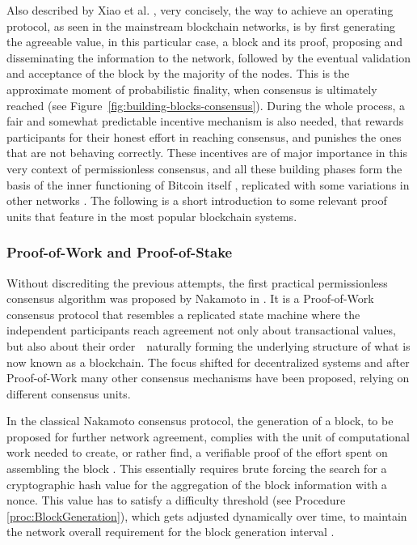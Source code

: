 Also described by Xiao et al. \cite{survey-dist-consensus}, very concisely, the way to achieve an operating protocol, as seen in the mainstream blockchain networks, is by first generating the agreeable value, in this particular case, a block and its proof, proposing and disseminating the information to the network, followed by the eventual validation and acceptance of the block by the majority of the nodes. This is the approximate moment of probabilistic finality, when consensus is ultimately reached (see Figure~\ref{fig:building-blocks-consensus}). During the whole process, a fair and somewhat predictable incentive mechanism is also needed, that rewards participants for their honest effort in reaching consensus, and punishes the ones that are not behaving correctly. These incentives are of major importance in this very context of permissionless consensus, and all these building phases form the basis of the inner functioning of Bitcoin itself \cite{nakamoto2008bitcoin}, replicated with some variations in other networks \cite{buterin2014next, survey-dist-consensus}. The following is a short introduction to some relevant proof units that feature in the most popular blockchain systems.

\subsubsection{Proof-of-Work and Proof-of-Stake}

Without discrediting the previous attempts, the first practical permissionless consensus algorithm was proposed by Nakamoto in \cite{nakamoto2008bitcoin}. It is a Proof-of-Work consensus protocol that resembles a replicated state machine where the independent participants reach agreement not only about transactional values, but also about their order~\textemdash~naturally forming the underlying structure of what is now known as a blockchain. The focus shifted for decentralized systems and after Proof-of-Work many other consensus mechanisms have been proposed, relying on different consensus units.

In the classical Nakamoto consensus protocol, the generation of a block, to be proposed for further network agreement, complies with the unit of computational work needed to create, or rather find, a verifiable proof of the effort spent on assembling the block \cite{nakamoto2008bitcoin}. This essentially requires brute forcing the search for a cryptographic hash value for the aggregation of the block information with a nonce. This value has to satisfy a difficulty threshold (see Procedure \ref{proc:BlockGeneration}), which gets adjusted dynamically over time, to maintain the network overall requirement for the block generation interval \cite{8629877, survey-dist-consensus}.

